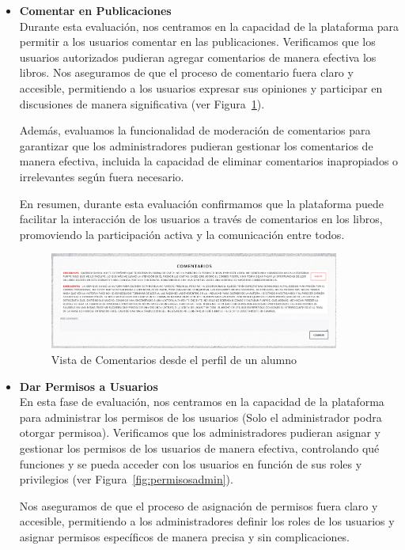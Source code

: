 \documentclass[a4paper, 12pt]{book}
\begin{document}
\begin{itemize}
\item \textbf{Comentar en Publicaciones}\\
Durante esta evaluación, nos centramos en la capacidad de la plataforma para permitir a los usuarios comentar en las publicaciones. Verificamos que los usuarios 
autorizados pudieran agregar comentarios de manera efectiva los libros. Nos aseguramos de que el proceso de comentario fuera claro y accesible, permitiendo a los 
usuarios expresar sus opiniones y participar en discusiones de manera significativa (ver Figura~\ref{fig:comentarios}).

Además, evaluamos la funcionalidad de moderación de comentarios para garantizar que los administradores pudieran gestionar los comentarios de manera efectiva, 
incluida la capacidad de eliminar comentarios inapropiados o irrelevantes según fuera necesario.

En resumen, durante esta evaluación confirmamos que la plataforma puede facilitar la interacción de los usuarios a través de comentarios en los libros, 
promoviendo la participación activa y la comunicación entre todos.

\begin{figure}
  \centering
  \includegraphics[width=0.9\textwidth]{img/comentarios.png}
  \caption{Vista de Comentarios desde el perfil de un alumno}
  \label{fig:comentarios}
\end{figure}

\item \textbf{Dar Permisos a Usuarios} \\
En esta fase de evaluación, nos centramos en la capacidad de la plataforma para administrar los permisos de los usuarios (Solo el administrador podra otorgar permisoa). 
Verificamos que los administradores pudieran asignar y gestionar los permisos de los usuarios de manera efectiva, controlando qué funciones y se pueda 
acceder con los usuarios en función de sus roles y privilegios (ver Figura~\ref{fig:permisosadmin}).

Nos aseguramos de que el proceso de asignación de permisos fuera claro y accesible, permitiendo a los administradores definir los roles de los usuarios y asignar 
permisos específicos de manera precisa y sin complicaciones.


\end{itemize}
\end{document}
